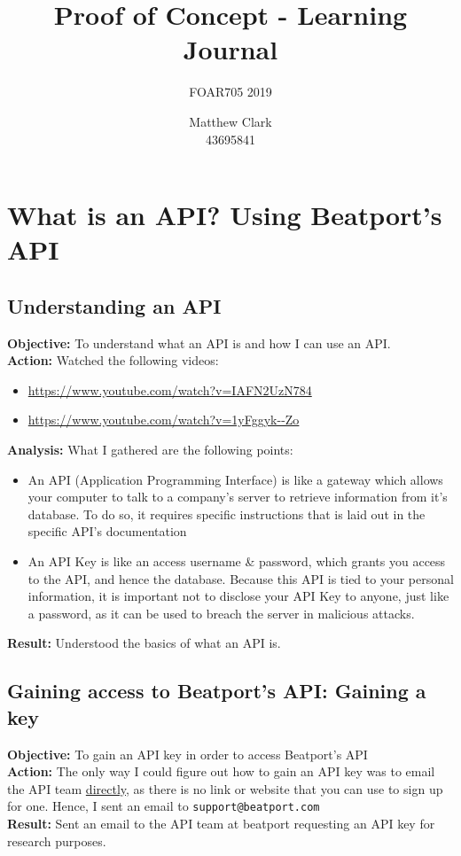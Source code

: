 \documentclass{article}
\title{Proof of Concept - Learning Journal}
\subtitle{FOAR705 2019}
\author{Matthew Clark\\43695841}
\date{\vspace{-5ex}} %
\begin{document}
\doublespacing
\maketitle
\newpage
\tableofcontents
\newpage
\section{What is an API? Using Beatport's API}
\subsection{Understanding an API}
\textbf{Objective:} To understand what an API is and how I can use an API.\\
\textbf{Action:} Watched the following videos:
\begin{itemize}
    \item \url{https://www.youtube.com/watch?v=IAFN2UzN784}
    \item \url{https://www.youtube.com/watch?v=1yFggyk--Zo}
\end{itemize}
\textbf{Analysis:} What I gathered are the following points:
\begin{itemize}
    \item An API (Application Programming Interface) is like a gateway which allows your computer to talk to a company's server to retrieve information from it's database. To do so, it requires specific instructions that is laid out in the specific API's documentation
    \item An API Key is like an access username \& password, which grants you access to the API, and hence the database. Because this API is tied to your personal information, it is important not to disclose your API Key to anyone, just like a password, as it can be used to breach the server in malicious attacks.
\end{itemize}
\textbf{Result:} Understood the basics of what an API is.
\subsection{Gaining access to Beatport's API: Gaining a key}
\textbf{Objective:} To gain an API key in order to access Beatport's API\\
\textbf{Action:} The only way I could figure out how to gain an API key was to email the API team \href{https://groups.google.com/forum/#!topic/beatport-api/dUk2nmhDnRo}{directly}, as there is no link or website that you can use to sign up for one. Hence, I sent an email to \verb|support@beatport.com|\\
\textbf{Result:} Sent an email to the API team at beatport requesting an API key for research purposes.
\end{document}
